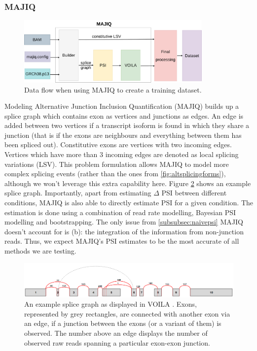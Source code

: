 \subsubsection{MAJIQ}\label{subsubsec:majiq}
\begin{figure}
	\centering\includegraphics[width=0.85\textwidth]{../visualizations/ch4-methods/visualizations-majiq.pdf} 
	\caption{Data flow when using MAJIQ to create a training dataset. }
	\label{fig:majiq_dataset_creation_process}
\end{figure}
Modeling Alternative Junction Inclusion Quantification (MAJIQ) builds up a splice graph \cite{majiq2} which contains exon as vertices and junctions as edges. An edge is added between two vertices if a transcript isoform is found in which they share a junction (that is if the exons are neighbours and everything between them has been spliced out).
Constitutive exons are vertices with two incoming edges.
Vertices which have more than 3 incoming edges are denoted as local splicing variations (LSV). This problem formulation allows MAJIQ to model more complex splicing events (rather than the ones from \ref{fig:altsplicingforms}), although we won't leverage this extra capability here. Figure \ref{fig:splice_graph} shows an example splice graph. Importantly, apart from estimating $\Delta$ PSI between different conditions, MAJIQ is also able to directly estimate PSI for a given condition. The estimation is done using a combination of read rate modelling, Bayesian PSI modelling and bootstrapping. The only issue from \ref{subsubsec:naivepsi} MAJIQ doesn't account for is (b): the integration of the information from non-junction reads. Thus, we expect MAJIQ's PSI estimates to be the most accurate of all methods we are testing.




\begin{figure}
	\centering\includegraphics[width=1\textwidth]{../visualizations/ch4-methods/splice_graph.png} 
	\caption{An example splice graph as displayed in VOILA \cite{majiq2}. Exons, represented by grey rectangles, are connected with another exon via an edge, if a junction between the exons (or a variant of them) is observed. The number above an edge displays the number of observed raw reads spanning a particular exon-exon junction.}
	\label{fig:splice_graph}
\end{figure}

